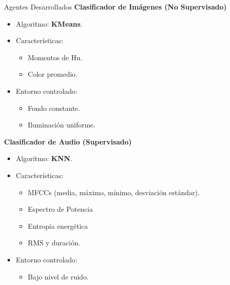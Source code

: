 \documentclass[12pt]{beamer}
\begin{document}
\begin{frame}{Agentes Desarrollados}
    \textbf{Clasificador de Imágenes (No Supervisado)}
    \begin{itemize}
        \item Algoritmo: \textbf{KMeans}.
        \item Características:
        \begin{itemize}
            \item Momentos de Hu.
            \item Color promedio.
        \end{itemize}
        \item Entorno controlado:
        \begin{itemize}
            \item Fondo constante.
            \item Iluminación uniforme.
        \end{itemize}
    \end{itemize}
    
    \vspace{0.5cm}  %
\end{frame}
\begin{frame}
    \textbf{Clasificador de Audio (Supervisado)}
    \begin{itemize}
        \item Algoritmo: \textbf{KNN}.
        \item Características:
        \begin{itemize}
            \item MFCCs (media, máximo, mínimo, desviación estándar).
            \item Espectro de Potencia
            \item Entropía energética
            \item RMS y duración.
        \end{itemize}
        \item Entorno controlado:
        \begin{itemize}
            \item Bajo nivel de ruido.
        \end{itemize}
    \end{itemize}
\end{frame}
\end{document}
